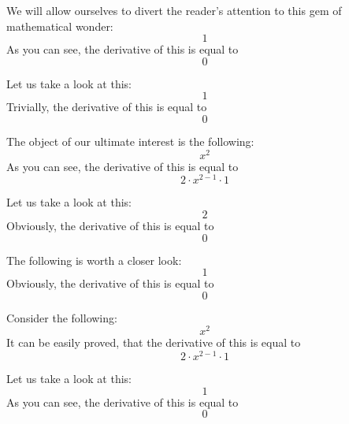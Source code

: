 \documentclass{article}
\begin{document}
We will allow ourselves to divert the reader's attention to this gem of mathematical wonder:
\begin{equation}
1 
\end{equation}
As you can see, the derivative of this is equal to
\begin{equation}
0 
\end{equation}

Let us take a look at this:
\begin{equation}
1 
\end{equation}
Trivially, the derivative of this is equal to
\begin{equation}
0 
\end{equation}

The object of our ultimate interest is the following:
\begin{equation}
x ^{2 } 
\end{equation}
As you can see, the derivative of this is equal to
\begin{equation}
2 \cdot x ^{2 - 1 } \cdot 1 
\end{equation}

Let us take a look at this:
\begin{equation}
2 
\end{equation}
Obviously, the derivative of this is equal to
\begin{equation}
0 
\end{equation}

The following is worth a closer look:
\begin{equation}
1 
\end{equation}
Obviously, the derivative of this is equal to
\begin{equation}
0 
\end{equation}

Consider the following:
\begin{equation}
x ^{2 } 
\end{equation}
It can be easily proved, that the derivative of this is equal to
\begin{equation}
2 \cdot x ^{2 - 1 } \cdot 1 
\end{equation}

Let us take a look at this:
\begin{equation}
1 
\end{equation}
As you can see, the derivative of this is equal to
\begin{equation}
0 
\end{equation}
\end{document}
